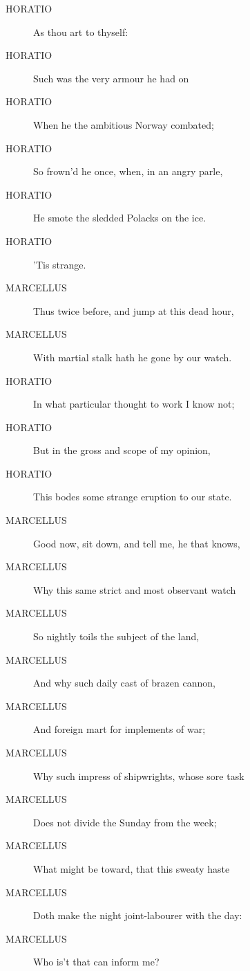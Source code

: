 \documentclass{article}
\begin{document}
\begin{description}
            
\item[HORATIO] As thou art to thyself:
\item[HORATIO] Such was the very armour he had on
\item[HORATIO] When he the ambitious Norway combated;
\item[HORATIO] So frown'd he once, when, in an angry parle,
\item[HORATIO] He smote the sledded Polacks on the ice.
\item[HORATIO] 'Tis strange.
\end{description}
          
\begin{description}
            
\item[MARCELLUS] Thus twice before, and jump at this dead hour,
\item[MARCELLUS] With martial stalk hath he gone by our watch.
\end{description}
          
\begin{description}
            
\item[HORATIO] In what particular thought to work I know not;
\item[HORATIO] But in the gross and scope of my opinion,
\item[HORATIO] This bodes some strange eruption to our state.
\end{description}
          
\begin{description}
            
\item[MARCELLUS] Good now, sit down, and tell me, he that knows,
\item[MARCELLUS] Why this same strict and most observant watch
\item[MARCELLUS] So nightly toils the subject of the land,
\item[MARCELLUS] And why such daily cast of brazen cannon,
\item[MARCELLUS] And foreign mart for implements of war;
\item[MARCELLUS] Why such impress of shipwrights, whose sore task
\item[MARCELLUS] Does not divide the Sunday from the week;
\item[MARCELLUS] What might be toward, that this sweaty haste
\item[MARCELLUS] Doth make the night joint-labourer with the day:
\item[MARCELLUS] Who is't that can inform me?
\end{description}
          
\end{document}
